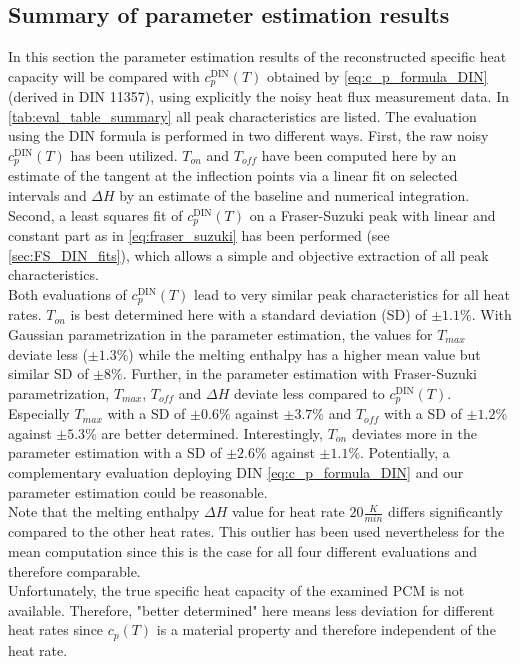 \documentclass{scrartcl}[12pt, halfparskip]
\numberwithin{equation}{section}
\numberwithin{figure}{section}
\numberwithin{table}{section}
\begin{document}
\subsection{Summary of parameter estimation results}
\label{sec:param_estimation_summary}

In this section the parameter estimation results of the reconstructed specific heat capacity will be compared with $c_p^{\text{DIN}}(T)$ obtained by \cref{eq:c_p_formula_DIN} (derived in DIN 11357), using explicitly the noisy heat flux measurement data. 
In \cref{tab:eval_table_summary} all peak characteristics are listed. 
The evaluation using the DIN formula is performed in two different ways. 
First, the raw noisy $c_p^{\text{DIN}}(T)$ has been utilized. 
$T_{on}$ and $T_{off}$ have been computed here by an estimate of the tangent at the inflection points via a linear fit on selected intervals and $\Delta H$ by an estimate of the baseline and numerical integration. 
Second, a least squares fit of $c_p^{\text{DIN}}(T)$ on a Fraser-Suzuki peak with linear and constant part as in \cref{eq:fraser_suzuki} has been performed (see \cref{sec:FS_DIN_fits}), which allows a simple and objective extraction of all peak characteristics.  \\
Both evaluations of $c_p^{\text{DIN}}(T)$ lead to very similar peak characteristics for all heat rates. $T_{on}$ is best determined here with a standard deviation (SD) of $\pm 1.1\%$. 
With Gaussian parametrization in the  parameter estimation, the values for $T_{max}$ deviate less ($\pm 1.3\%$) while the melting enthalpy has a higher mean value but similar SD of $\pm 8\%$. 
Further, in the parameter estimation with Fraser-Suzuki parametrization, $T_{max}$, $T_{off}$ and $\Delta H$ deviate less compared to $c_p^{\text{DIN}}(T)$. 
Especially $T_{max}$ with a SD of $\pm 0.6\%$ against $\pm 3.7\%$ and $T_{off}$ with a SD of $\pm 1.2\%$ against $\pm 5.3 \%$ are better determined. 
Interestingly, $T_{on}$ deviates more in the parameter estimation with a SD of $\pm 2.6\%$ against $\pm 1.1\%$. 
Potentially, a complementary evaluation deploying DIN \cref{eq:c_p_formula_DIN} and our parameter estimation could be reasonable. \\
Note that the melting enthalpy $\Delta H$ value for heat rate $20 \frac{K}{min}$ differs significantly compared to the other heat rates. 
This outlier has been used nevertheless for the mean computation since this is the case for all four different evaluations and therefore comparable. \\
Unfortunately, the true specific heat capacity of the examined PCM is not available. Therefore, "better determined" here means less deviation for different heat rates since $c_p(T)$ is a material property and therefore independent of the heat rate.
\end{document}
